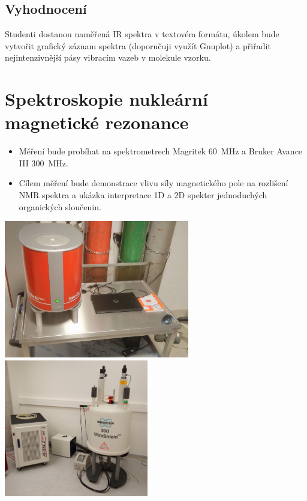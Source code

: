 \documentclass[12pt]{article}
\begin{document}
\subsection{Vyhodnocení}

Studenti dostanou naměřená IR spektra v textovém formátu, úkolem bude vytvořit grafický záznam spektra (doporučuji využít Gnuplot) a přiřadit nejintenzivnější pásy vibracím vazeb v molekule vzorku. 

\newpage
\section{Spektroskopie nukleární magnetické rezonance}
	\begin{itemize}
	\item Měření bude probíhat na spektrometrech Magritek 60~MHz a Bruker Avance III 300~MHz.
	\item Cílem měření bude demonstrace vlivu síly magnetického pole na rozlišení NMR spektra a ukázka interpretace 1D a 2D spekter jednoduchých organických sloučenin.
	\end{itemize}
	\begin{center}
		\includegraphics[keepaspectratio,height=6cm]{img/Magritek.jpg}
		\includegraphics[keepaspectratio,height=6cm]{img/NMR300-1S12.jpg}
	\end{center}
\end{document}
